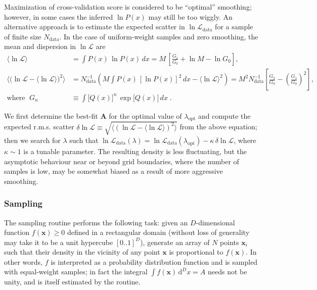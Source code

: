 \documentclass[12pt]{article}
\newcommand{\D}{\mathrm{d}}
\newcommand{\bA}{\boldsymbol{A}}
\newcommand{\bx}{\boldsymbol{x}}
\begin{document}
Maximization of cross-validation score is considered to be ``optimal'' smoothing; however, in some cases the inferred $\ln P(x)$ may still be too wiggly. An alternative approach is to estimate the expected scatter in $\ln\mathcal{L}_\mathrm{data}$ for a sample of finite size $N_\mathrm{data}$. In the case of uniform-weight samples and zero smoothing, the mean and dispersion in $\ln\mathcal{L}$ are
\begin{align}
\big\langle\ln\mathcal{L}\big\rangle &=
  \int P(x)\,\ln P(x)\, dx = M\,\left[\frac{G_1}{G_0} + \ln M - \ln G_0\right] ,\\
\Big\langle\big(\ln\mathcal{L}-\langle\ln\mathcal{L}\rangle\big)^2\Big\rangle &=
  N_\mathrm{data}^{-1} \left( M\!\int\! P(x)\,[\ln P(x)]^2\, dx - \big\langle\ln\mathcal{L}\big\rangle^2 \right) =
  M^2 N_\mathrm{data}^{-1} \left[\frac{G_2}{G_0} - \left(\frac{G_1}{G_0}\right)^{\!2}\right]\! , \nonumber\\
\mbox{where }\; G_n &\equiv \int \big[Q(x)\big]^n\, \exp\big[Q(x)\big]\,dx\;.  \nonumber
\end{align}

We first determine the best-fit $\bA$ for the optimal value of $\lambda_\mathrm{opt}$ and compute the expected r.m.s. scatter $\delta\ln\mathcal{L}\equiv \sqrt{\langle(\ln\mathcal{L}-\langle\ln\mathcal{L}\rangle)^2\rangle}$ from the above equation; then we search for $\lambda$ such that $\ln\mathcal{L}_\mathrm{data}(\lambda) = \ln\mathcal{L}_\mathrm{data}(\lambda_\mathrm{opt}) - \kappa\, \delta\ln\mathcal{L}$, where $\kappa\sim 1$ is a tunable parameter. The resulting density is less fluctuating, but the asymptotic behaviour near or beyond grid boundaries, where the number of samples is low, may be somewhat biased as a result of more aggressive smoothing.

\subsubsection{Sampling}  \label{sec:MathSamplingDetails}

The sampling routine performs the following task: given an $D$-dimensional function $f(\bx)\ge 0$ defined in a rectangular domain (without loss of generality may take it to be a unit hypercube $[0..1]^D$), generate an array of $N$ points $\bx_i$ such that their density in the vicinity of any point $\bx$ is proportional to $f(\bx)$. In other words, $f$ is interpreted as a probability distribution function and is sampled with equal-weight samples; in fact the integral $\int f(\bx)\, \D^D x = A$ needs not be unity, and is itself estimated by the routine.
\end{document}
